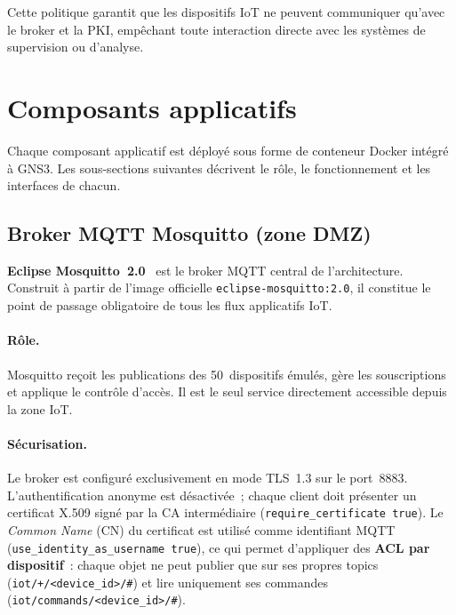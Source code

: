 Cette politique garantit que les dispositifs IoT ne peuvent communiquer qu'avec le broker et la PKI, empêchant toute interaction directe avec les systèmes de supervision ou d'analyse.

\section{Composants applicatifs}
\label{sec:env-composants}

Chaque composant applicatif est déployé sous forme de conteneur Docker intégré à GNS3. Les sous-sections suivantes décrivent le rôle, le fonctionnement et les interfaces de chacun.

\subsection{Broker MQTT Mosquitto (zone DMZ)}
\label{subsec:env-mosquitto}

\textbf{Eclipse Mosquitto~2.0}~\cite{mosquitto_tls} est le broker MQTT central de l'architecture. Construit à partir de l'image officielle \texttt{eclipse-mosquitto:2.0}, il constitue le point de passage obligatoire de tous les flux applicatifs IoT.

\paragraph{Rôle.}
Mosquitto reçoit les publications des 50~dispositifs émulés, gère les souscriptions et applique le contrôle d'accès. Il est le seul service directement accessible depuis la zone IoT.

\paragraph{Sécurisation.}
Le broker est configuré exclusivement en mode TLS~1.3 sur le port~8883. L'authentification anonyme est désactivée~; chaque client doit présenter un certificat X.509 signé par la CA intermédiaire (\texttt{require\_certificate true}). Le \emph{Common Name} (CN) du certificat est utilisé comme identifiant MQTT (\texttt{use\_identity\_as\_username true}), ce qui permet d'appliquer des \textbf{ACL par dispositif}~: chaque objet ne peut publier que sur ses propres topics (\texttt{iot/+/<device\_id>/\#}) et lire uniquement ses commandes (\texttt{iot/commands/<device\_id>/\#}).

